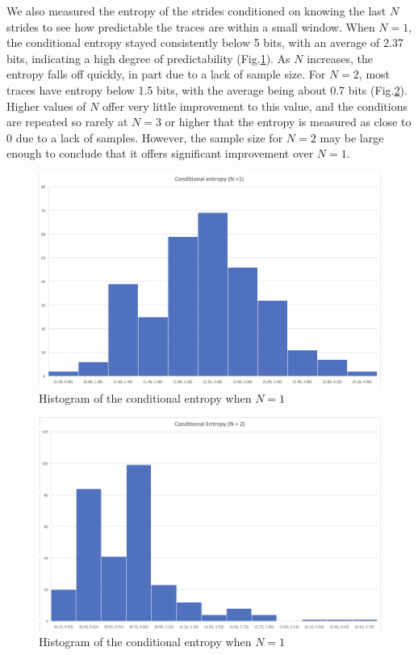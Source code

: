 \documentclass{article}
\begin{document}
We also measured the entropy of the strides conditioned on knowing the last $N$ strides to see how predictable the traces are within a small window.  When $N = 1$, the conditional entropy stayed consistently below 5 bits, with an average of 2.37 bits, indicating a high degree of predictability (Fig.\ref{fig:cond1}).  As $N$ increases, the entropy falls off quickly, in part due to a lack of sample size.  For $N = 2$, most traces have entropy below 1.5 bits, with the average being about 0.7 bits (Fig.\ref{fig:cond2}).  Higher values of $N$ offer very little improvement to this value, and the conditions are repeated so rarely at $N = 3$ or higher that the entropy is measured as close to 0 due to a lack of samples.  However, the sample size for $N = 2$ may be large enough to conclude that it offers significant improvement over $N = 1$.

\begin{figure}[ht]
    \centering
    \includegraphics[scale=0.7]{conditional 1.png}
    \caption{Histogram of the conditional entropy when $N = 1$}
    \label{fig:cond1}
\end{figure}

\begin{figure}[ht]
    \centering
    \includegraphics[scale=0.7]{conditional 2.png}
    \caption{Histogram of the conditional entropy when $N = 1$}
    \label{fig:cond2}
\end{figure}
\end{document}
